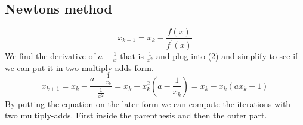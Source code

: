 \documentclass[a4paper]{article}
\begin{document}
\subsection{Newtons method}
\begin{equation}
	x_{k+1} = x_k - \frac{f(x)}{f^{\prime}(x)}
\end{equation}
We find the  derivative of $a-\frac{1}{x}$ that is  $\frac{1}{x^2}$ and plug into (2) and simplify to see if we can put it in two multiply-adds form.
\begin{equation}
	x_{k+1} = x_k - \frac{a-\frac{1}{x_k}}{\frac{1}{x^2}} = x_k - x^2_k \left( a-\frac{1}{x_k} \right) = x_k-x_k\left( ax_k-1 \right)  
\end{equation}
By putting the equation on the later form we can compute the iterations with two multiply-adds. First inside the parenthesis and then the outer part. 

\newpage
\end{document}
